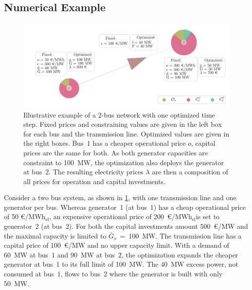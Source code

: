 \documentclass[11pt,twocolumn]{article}
\newcommand{\capacitygenerationupper}{\bar{G}_{s}}
\newcommand{\megawatthour}{MWh$_\text{el}$}
\begin{document}
\subsection{Numerical Example}
\label{sec:numerical_example}

\begin{figure}[t]
    \centering
    \includegraphics[width=\linewidth]{example_network.png}
    \caption{Illustrative example of a 2-bus network with one optimized time step. Fixed prices and constraining values are given in the left box for each bus and the transmission line. Optimized values are given in the right boxes. Bus~1 has a cheaper operational price $o$, capital prices are the same for both. As both generator capacities are constraint to 100~MW, the optimization also deploys the generator at bus~2. The resulting electricity prices $\lambda$ are then a composition of all prices for operation and capital investments.}
    \label{fig:example_network}
    \end{figure}
% 
% 
Consider a two bus system, as shown in \cref{fig:example_network}, with one transmission line and one generator per bus. Whereas generator~1 (at bus~1) has a cheap operational price of 50 \euro/\megawatthour, an expensive operational price of 200~\euro/\megawatthour is set to  generator~2 (at bus~2). For both the capital investments amount 500~\euro/MW and the maximal capacity is limited to $\capacitygenerationupper$~=~100~MW. The transmission line has a capital price of 100~\euro/MW and no upper capacity limit. With a demand of 60~MW at bus~1 and 90~MW at bus~2, the optimization expands the cheaper generator at bus~1 to its full limit of 100~MW. The 40~MW excess power, not consumed at bus~1, flows to bus~2 where the generator is built with only 50~MW. \\
%  
\end{document}

